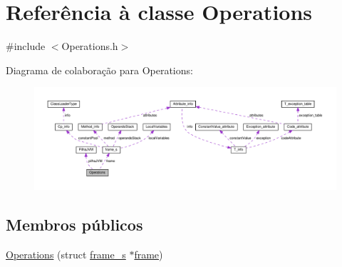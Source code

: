 \hypertarget{classOperations}{}\section{Referência à classe Operations}
\label{classOperations}


{\ttfamily \#include $<$Operations.\+h$>$}



Diagrama de colaboração para Operations\+:
\nopagebreak
\begin{figure}[H]
\begin{center}
\leavevmode
\includegraphics[width=350pt]{classOperations__coll__graph}
\end{center}
\end{figure}
\subsection*{Membros públicos}
\begin{DoxyCompactItemize}
\item 
\hyperlink{classOperations_a302329a641fa78f54d1f1f307736b870}{Operations} (struct \hyperlink{structframe__s}{frame\+\_\+s} $\ast$\hyperlink{classOperations_a0dc7b3710786c9cbd14801ac3e5d34b2}{frame})
\end{DoxyCompactItemize}
